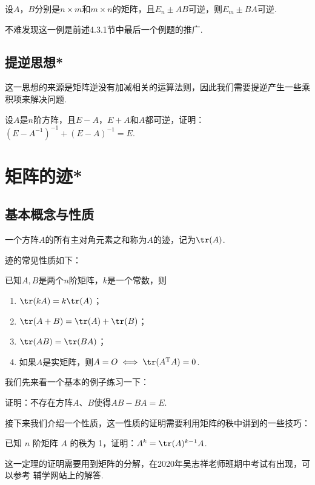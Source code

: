 \begin{example}
    设$A$，$B$分别是$n \times m$和$m \times n$的矩阵，且$E_n \pm AB$可逆，则$E_m \pm BA$可逆.
\end{example}
不难发现这一例是前述4.3.1节中最后一个例题的推广. %

\subsection{提逆思想*}
这一思想的来源是矩阵逆没有加减相关的运算法则，因此我们需要提逆产生一些乘积项来解决问题.
\begin{example}
    设$A$是$n$阶方阵，且$E-A$，$E+A$和$A$都可逆，证明：$(E-A^{-1})^{-1}+(E-A)^{-1}=E$.
\end{example}

\section{矩阵的迹*}
\subsection{基本概念与性质}
\begin{definition}
    一个方阵$A$的所有主对角元素之和称为$A$的迹，记为$\tr(A)$.
\end{definition}
迹的常见性质如下：
\begin{theorem}
    已知$A, B$是两个$n$阶矩阵，$k$是一个常数，则
    \begin{enumerate}
        \item $\tr(kA) = k\tr(A)$；

        \item $\tr(A+B)=\tr(A)+\tr(B)$；

        \item $\tr(AB)=\tr(BA)$；

        \item 如果$A$是实矩阵，则$A=O \iff \tr(A^{\mathrm{T}}A)=0$.
    \end{enumerate}
\end{theorem}

我们先来看一个基本的例子练习一下：
\begin{example}
    证明：不存在方阵$A$、$B$使得$AB-BA=E$.
\end{example}

接下来我们介绍一个性质，这一性质的证明需要利用矩阵的秩中讲到的一些技巧：
\begin{theorem}
    已知 $n$ 阶矩阵 $A$ 的秩为 1，证明：$A^k=\tr(A)^{k-1}A$.
\end{theorem}
这一定理的证明需要用到矩阵的分解，在2020年吴志祥老师班期中考试有出现，可以参考
辅学网站上的解答.

